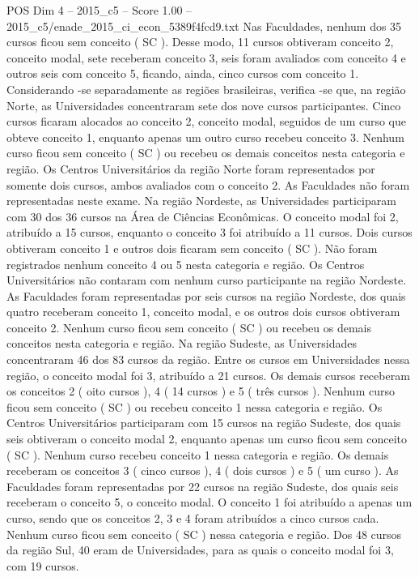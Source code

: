 \begin{textsample}{POS Dim 4 – 2015\_c5 – Score 1.00 – 2015\_c5/enade\_2015\_ci\_econ\_5389f4fcd9.txt}
Nas Faculdades, nenhum dos 35 cursos ficou sem conceito ( SC ).
Desse modo, 11 cursos obtiveram conceito 2, conceito modal, sete receberam conceito 3, seis foram avaliados com conceito 4 e outros seis com conceito 5, ficando, ainda, cinco cursos com conceito 1.
Considerando -se separadamente as regiões brasileiras, verifica -se que, na região Norte, as Universidades concentraram sete dos nove cursos participantes.
Cinco cursos ficaram alocados ao conceito 2, conceito modal, seguidos de um curso que obteve conceito 1, enquanto apenas um outro curso recebeu conceito 3.
Nenhum curso ficou sem conceito ( SC ) ou recebeu os demais conceitos nesta categoria e região.
Os Centros Universitários da região Norte foram representados por somente dois cursos, ambos avaliados com o conceito 2.
As Faculdades não foram representadas neste exame.
Na região Nordeste, as Universidades participaram com 30 dos 36 cursos na Área de Ciências Econômicas.
O conceito modal foi 2, atribuído a 15 cursos, enquanto o conceito 3 foi atribuído a 11 cursos.
Dois cursos obtiveram conceito 1 e outros dois ficaram sem conceito ( SC ).
Não foram registrados nenhum conceito 4 ou 5 nesta categoria e região.
Os Centros Universitários não contaram com nenhum curso participante na região Nordeste.
As Faculdades foram representadas por seis cursos na região Nordeste, dos quais quatro receberam conceito 1, conceito modal, e os outros dois cursos obtiveram conceito 2.
Nenhum curso ficou sem conceito ( SC ) ou recebeu os demais conceitos nesta categoria e região.
Na região Sudeste, as Universidades concentraram 46 dos 83 cursos da região.
Entre os cursos em Universidades nessa região, o conceito modal foi 3, atribuído a 21 cursos.
Os demais cursos receberam os conceitos 2 ( oito cursos ), 4 ( 14 cursos ) e 5 ( três cursos ).
Nenhum curso ficou sem conceito ( SC ) ou recebeu conceito 1 nessa categoria e região.
Os Centros Universitários participaram com 15 cursos na região Sudeste, dos quais seis obtiveram o conceito modal 2, enquanto apenas um curso ficou sem conceito ( SC ).
Nenhum curso recebeu conceito 1 nessa categoria e região.
Os demais receberam os conceitos 3 ( cinco cursos ), 4 ( dois cursos ) e 5 ( um curso ).
As Faculdades foram representadas por 22 cursos na região Sudeste, dos quais seis receberam o conceito 5, o conceito modal.
O conceito 1 foi atribuído a apenas um curso, sendo que os conceitos 2, 3 e 4 foram atribuídos a cinco cursos cada.
Nenhum curso ficou sem conceito ( SC ) nessa categoria e região.
Dos 48 cursos da região Sul, 40 eram de Universidades, para as quais o conceito modal foi 3, com 19 cursos.

\end{textsample}
